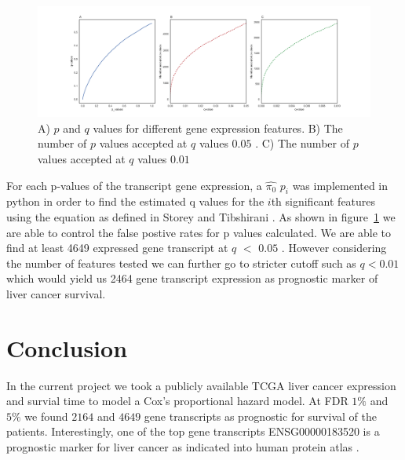 \documentclass{article}
\begin{document}
\begin{figure}
\hspace*{-4cm}         
\centering
     \includegraphics[width=1.57\textwidth]{comb.png}
    \caption{A) $p$ and $q$ values for  different gene expression features. B) The number of $p$ values accepted at $q$ values $0.05$ . C) The number of $p$ values accepted at $q$ values $0.01$}
    \label{fig:pandq}
\end{figure}	
	
	 For each p-values of the transcript gene expression, a $\hat {\pi_0}$ $p_i$  was implemented in python in order to find the estimated q values for the  $i$th significant features using the equation as defined in Storey and Tibshirani \cite{storey2003statistical}. As shown in figure~\ref{fig:pandq} we are able to control the false postive rates for p values calculated. We are able to find at least 4649 expressed gene transcript at $q$ $<$ $0.05$ . However considering the number of features tested we can further go to stricter cutoff such as $q < 0.01$ which would yield us 2464 gene transcript expression  as prognostic marker of liver cancer survival. 

\newpage

\section{Conclusion}
In the current project we took a publicly available TCGA liver cancer expression and survial time to model a Cox's proportional hazard model. At FDR $1\%$ and $5\%$ we found $2164$ and $4649$ gene transcripts as prognostic for survival of the patients. Interestingly,  one of the top gene transcripts ENSG00000183520 is a prognostic  marker  for liver cancer as indicated into human protein atlas \cite{uhlen2015tissue}.



\end{document}
